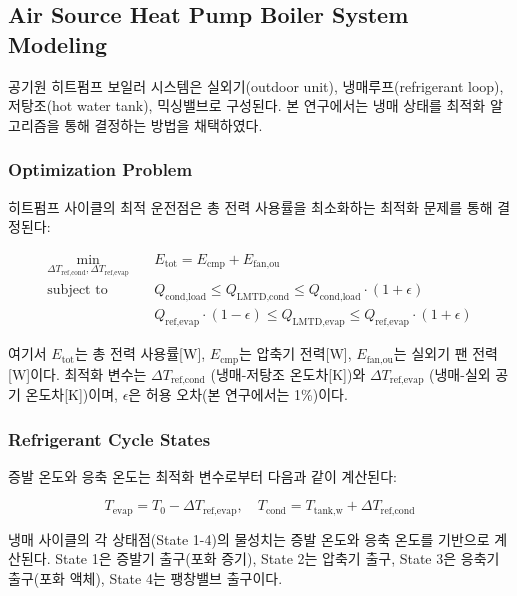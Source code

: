 \documentclass[final,5p,times,twocolumn,authoryear]{elsarticle}
\begin{document}
\subsection{Air Source Heat Pump Boiler System Modeling}

공기원 히트펌프 보일러 시스템은 실외기(outdoor unit), 냉매루프(refrigerant loop), 저탕조(hot water tank), 믹싱밸브로 구성된다. 본 연구에서는 냉매 상태를 최적화 알고리즘을 통해 결정하는 방법을 채택하였다.

\subsubsection{Optimization Problem}

히트펌프 사이클의 최적 운전점은 총 전력 사용률을 최소화하는 최적화 문제를 통해 결정된다:

\begin{equation}
\label{eq:hpb_optimization}
\begin{aligned}
\min_{\Delta T_{\text{ref,cond}}, \Delta T_{\text{ref,evap}}} \quad & E_{\text{tot}} = E_{\text{cmp}} + E_{\text{fan,ou}} \\
\text{subject to} \quad & Q_{\text{cond,load}} \leq Q_{\text{LMTD,cond}} \leq Q_{\text{cond,load}} \cdot (1 + \epsilon) \\
& Q_{\text{ref,evap}} \cdot (1 - \epsilon) \leq Q_{\text{LMTD,evap}} \leq Q_{\text{ref,evap}} \cdot (1 + \epsilon)
\end{aligned}
\end{equation}

여기서 $E_{\text{tot}}$는 총 전력 사용률[W], $E_{\text{cmp}}$는 압축기 전력[W], $E_{\text{fan,ou}}$는 실외기 팬 전력[W]이다. 최적화 변수는 $\Delta T_{\text{ref,cond}}$ (냉매-저탕조 온도차[K])와 $\Delta T_{\text{ref,evap}}$ (냉매-실외 공기 온도차[K])이며, $\epsilon$은 허용 오차(본 연구에서는 1\%)이다.

\subsubsection{Refrigerant Cycle States}

증발 온도와 응축 온도는 최적화 변수로부터 다음과 같이 계산된다:

\begin{equation}
\label{eq:hpb_temperatures}
T_{\text{evap}} = T_0 - \Delta T_{\text{ref,evap}}, \quad T_{\text{cond}} = T_{\text{tank,w}} + \Delta T_{\text{ref,cond}}
\end{equation}

냉매 사이클의 각 상태점(State 1-4)의 물성치는 증발 온도와 응축 온도를 기반으로 계산된다. State 1은 증발기 출구(포화 증기), State 2는 압축기 출구, State 3은 응축기 출구(포화 액체), State 4는 팽창밸브 출구이다.
\end{document}
